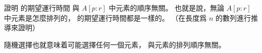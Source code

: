 \startEXERCISE
證明  的期望運行時間
與 $A[p:r]$ 中元素的順序無關。
也就是說，無論 $A[p:r]$ 中元素是怎麼排列的，
  的期望運行時間都是一樣的。
（在長度爲 $n$ 的數列進行推導來證明）
\stopEXERCISE

\startANSWER
隨機選擇也就意味着可能選擇任何一個元素，
與元素的排列順序無關。
\stopANSWER
